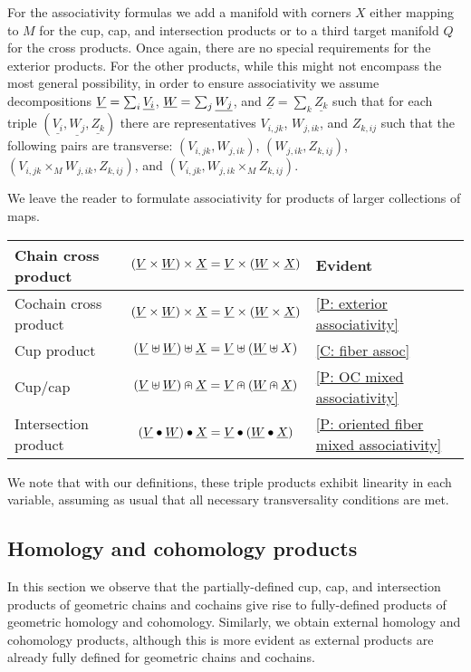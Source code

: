 For the associativity formulas we add a manifold with corners $X$ either mapping to $M$ for the cup, cap, and intersection products or to a third target manifold $Q$ for the cross products.
Once again, there are no special requirements for the exterior products.
For the other products, while this might not encompass the most general possibility, in order to ensure associativity we assume decompositions $\underline{V} = \sum_i \underline{V_i}$, $\underline{W} = \sum_j \underline{W_j}$, and $\underline{Z} = \sum_k \underline{Z_k}$ such that for each triple $(\underline{V_i},\underline{W_j}, \underline{Z_k})$ there are representatives $V_{i,jk}$, $W_{j,ik}$, and $Z_{k,ij}$ such that the following pairs are transverse: $(V_{i,jk}, W_{j,ik})$, $(W_{j,ik},Z_{k,ij})$, $(V_{i,jk} \times_M W_{j,ik},Z_{k,ij})$, and $(V_{i,jk}, W_{j,ik} \times_M Z_{k,ij})$.

We leave the reader to formulate associativity for products of larger collections of maps.

\begin{center}
	\begin{tabular}{|l|c|l|}
		\hline
		Chain cross product& $(\underline{V} \times \underline{W}) \times \underline{X} = \underline{V} \times (\underline{W} \times \underline{X})$&Evident\\
		\hline
		Cochain cross product& $(\underline{V} \times \underline{W}) \times \underline{X} = \underline{V} \times (\underline{W} \times \underline{X})$&\cref{P: exterior associativity}\\
		\hline
		Cup product &$(\underline{V}\uplus \underline{W})\uplus\underline{X} = \underline{V}\uplus(\underline{W}\uplus X)$&\cref{C: fiber assoc} \\
		\hline
		Cup/cap & $(\underline{V} \uplus \underline{W})\nplus \underline{X} = \underline{V}\nplus(\underline{W}\nplus\underline{X})$& \cref{P: OC mixed associativity}\\
		\hline
		Intersection product &
		$(\underline{V}\bullet\underline{W})\bullet\underline{X} = \underline{V}\bullet(\underline{W}\bullet \underline{X})$&\cref{P: oriented fiber mixed associativity}\\
		\hline
	\end{tabular}
\end{center}

We note that with our definitions, these triple products exhibit linearity in each variable, assuming as usual that all necessary transversality conditions are met.

\subsection{Homology and cohomology products}\label{S: homology products}

In this section we observe that the partially-defined cup, cap, and intersection products of geometric chains and cochains give rise to fully-defined products of geometric homology and cohomology.
Similarly, we obtain external homology and cohomology products, although this is more evident as external products are already fully defined for geometric chains and cochains.

